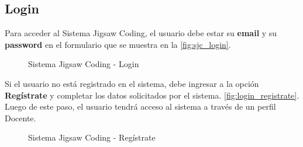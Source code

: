 \subsection{Login} 
Para acceder al Sistema Jigsaw Coding, el usuario debe estar su \textbf{email} y su \textbf{password} en el formulario que se muestra en la \autoref{fig:sjc_login}.

\begin{figure}[h!]
	\centering
	\caption[SJC Login]{Sistema Jigsaw Coding - Login}
	\label{fig:sjc_login}
\end{figure}

Si el usuario no está registrado en el sistema, debe ingresar a la opción \textbf{Regístrate} y completar los datos solicitados por el sistema. \autoref{fig:login_registrate}. Luego de este paso, el usuario tendrá acceso al sistema a través de un perfil Docente.\\

\begin{figure}[h!]
	\centering
	\caption[SJC Registrate]{Sistema Jigsaw Coding - Regístrate}
	\label{fig:login_registrate}
\end{figure}

